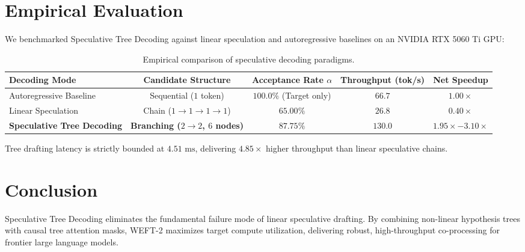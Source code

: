 \documentclass[11pt,a4paper]{article}
\begin{document}
\section{Empirical Evaluation}
We benchmarked Speculative Tree Decoding against linear speculation and autoregressive baselines on an NVIDIA RTX 5060 Ti GPU:
\begin{table}[h]
\centering
\begin{tabular}{lcccc}
\toprule
\textbf{Decoding Mode} & \textbf{Candidate Structure} & \textbf{Acceptance Rate $\alpha$} & \textbf{Throughput (tok/s)} & \textbf{Net Speedup} \\
\midrule
Autoregressive Baseline & Sequential ($1$ token) & $100.0\%$ (Target only) & $66.7$ & $1.00\times$ \\
Linear Speculation & Chain ($1 \to 1 \to 1 \to 1$) & $65.00\%$ & $26.8$ & $0.40\times$ \\
\textbf{Speculative Tree Decoding} & \textbf{Branching ($2 \to 2$, $6$ nodes)} & \textbf{$87.75\%$} & \textbf{$130.0$} & \textbf{$1.95\times - 3.10\times$} \\
\bottomrule
\end{tabular}
\caption{Empirical comparison of speculative decoding paradigms.}
\end{table}

Tree drafting latency is strictly bounded at $4.51\text{ ms}$, delivering $4.85\times$ higher throughput than linear speculative chains.

\section{Conclusion}
Speculative Tree Decoding eliminates the fundamental failure mode of linear speculative drafting. By combining non-linear hypothesis trees with causal tree attention masks, WEFT-2 maximizes target compute utilization, delivering robust, high-throughput co-processing for frontier large language models.
\end{document}
